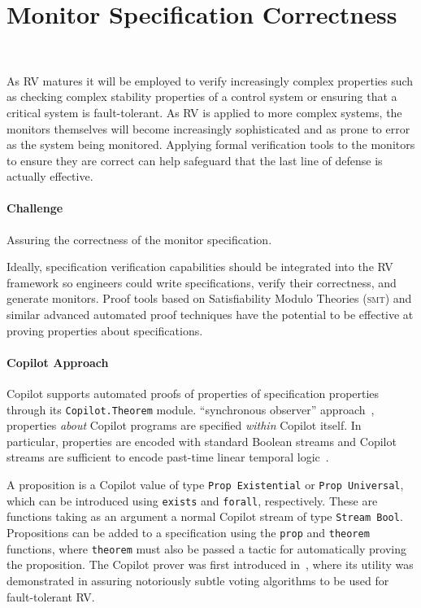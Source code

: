 \section{Monitor Specification Correctness}~\label{sec:verispec}

As RV matures it will be employed to
verify increasingly complex properties such as checking complex
stability properties of a control system or ensuring that a critical
system is fault-tolerant. As RV is applied to more complex systems, the
monitors themselves will become increasingly sophisticated and as prone to error
as the system being monitored.  Applying formal verification
tools to the monitors to ensure they are correct can help safeguard
that the last line of defense is actually effective. 

\paragraph{Challenge}  Assuring the correctness of the monitor
specification.   

Ideally, specification verification capabilities should be integrated
into the RV framework so engineers could write specifications, verify
their correctness, and generate monitors.  Proof tools based on
Satisfiability Modulo Theories (\textsc{smt}) and similar advanced
automated proof techniques have the potential to be effective at
proving properties about specifications. 


\paragraph{Copilot Approach}  
 Copilot supports automated proofs of properties of specification
 properties  through its {\tt Copilot.Theorem} module.  
``synchronous observer'' approach~\cite{amast93}, properties \emph{about}
Copilot programs are specified \emph{within} Copilot itself. In particular,
properties are encoded with standard Boolean streams and Copilot streams are
sufficient to encode past-time linear temporal logic~\cite{ptltl}.

 A proposition is a Copilot value of type \texttt{Prop Existential}
 or \texttt{Prop Universal}, which can be introduced using \texttt{exists} and
\texttt{forall}, respectively. These are functions taking as an argument a
normal Copilot stream of type \lstinline{Stream Bool}. Propositions can be added
to a specification using the \texttt{prop} and \texttt{theorem} functions,
where \texttt{theorem} must also be passed a tactic for automatically proving
the proposition. The Copilot prover was first introduced
in~\cite{pike-rv-15}, where its utility was demonstrated in assuring
notoriously subtle voting algorithms to be used for fault-tolerant RV.

